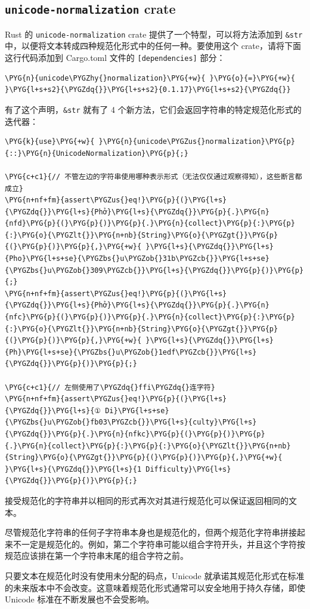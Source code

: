 \subsection{\texttt{unicode-normalization} crate}

Rust 的 \texttt{unicode-normalization} crate 提供了一个特型，可以将方法添加到 \texttt{\&str} 中，以便将文本转成四种规范化形式中的任何一种。要使用这个 crate，请将下面这行代码添加到 Cargo.toml 文件的 \texttt{[dependencies]} 部分：

\begin{Verbatim}[commandchars=\\\{\},breaklines=true,breakanywhere=true,fontsize=\codefont,xleftmargin=17bp]
\PYG{n}{unicode\PYGZhy{}normalization}\PYG{+w}{ }\PYG{o}{=}\PYG{+w}{ }\PYG{l+s+s2}{\PYGZdq{}}\PYG{l+s+s2}{0.1.17}\PYG{l+s+s2}{\PYGZdq{}}
\end{Verbatim}

有了这个声明，\texttt{\&str} 就有了 4 个新方法，它们会返回字符串的特定规范化形式的迭代器：

\begin{Verbatim}[commandchars=\\\{\},breaklines=true,breakanywhere=true,fontsize=\codefont,xleftmargin=17bp]
\PYG{k}{use}\PYG{+w}{ }\PYG{n}{unicode\PYGZus{}normalization}\PYG{p}{::}\PYG{n}{UnicodeNormalization}\PYG{p}{;}

\PYG{c+c1}{// 不管左边的字符串使用哪种表示形式（无法仅仅通过观察得知），这些断言都成立}
\PYG{n+nf+fm}{assert\PYGZus{}eq!}\PYG{p}{(}\PYG{l+s}{\PYGZdq{}}\PYG{l+s}{Phở}\PYG{l+s}{\PYGZdq{}}\PYG{p}{.}\PYG{n}{nfd}\PYG{p}{(}\PYG{p}{)}\PYG{p}{.}\PYG{n}{collect}\PYG{p}{:}\PYG{p}{:}\PYG{o}{\PYGZlt{}}\PYG{n+nb}{String}\PYG{o}{\PYGZgt{}}\PYG{p}{(}\PYG{p}{)}\PYG{p}{,}\PYG{+w}{ }\PYG{l+s}{\PYGZdq{}}\PYG{l+s}{Pho}\PYG{l+s+se}{\PYGZbs{}u\PYGZob{}31b\PYGZcb{}}\PYG{l+s+se}{\PYGZbs{}u\PYGZob{}309\PYGZcb{}}\PYG{l+s}{\PYGZdq{}}\PYG{p}{)}\PYG{p}{;}
\PYG{n+nf+fm}{assert\PYGZus{}eq!}\PYG{p}{(}\PYG{l+s}{\PYGZdq{}}\PYG{l+s}{Phở}\PYG{l+s}{\PYGZdq{}}\PYG{p}{.}\PYG{n}{nfc}\PYG{p}{(}\PYG{p}{)}\PYG{p}{.}\PYG{n}{collect}\PYG{p}{:}\PYG{p}{:}\PYG{o}{\PYGZlt{}}\PYG{n+nb}{String}\PYG{o}{\PYGZgt{}}\PYG{p}{(}\PYG{p}{)}\PYG{p}{,}\PYG{+w}{ }\PYG{l+s}{\PYGZdq{}}\PYG{l+s}{Ph}\PYG{l+s+se}{\PYGZbs{}u\PYGZob{}1edf\PYGZcb{}}\PYG{l+s}{\PYGZdq{}}\PYG{p}{)}\PYG{p}{;}

\PYG{c+c1}{// 左侧使用了\PYGZdq{}ffi\PYGZdq{}连字符}
\PYG{n+nf+fm}{assert\PYGZus{}eq!}\PYG{p}{(}\PYG{l+s}{\PYGZdq{}}\PYG{l+s}{① Di}\PYG{l+s+se}{\PYGZbs{}u\PYGZob{}fb03\PYGZcb{}}\PYG{l+s}{culty}\PYG{l+s}{\PYGZdq{}}\PYG{p}{.}\PYG{n}{nfkc}\PYG{p}{(}\PYG{p}{)}\PYG{p}{.}\PYG{n}{collect}\PYG{p}{:}\PYG{p}{:}\PYG{o}{\PYGZlt{}}\PYG{n+nb}{String}\PYG{o}{\PYGZgt{}}\PYG{p}{(}\PYG{p}{)}\PYG{p}{,}\PYG{+w}{ }\PYG{l+s}{\PYGZdq{}}\PYG{l+s}{1 Difficulty}\PYG{l+s}{\PYGZdq{}}\PYG{p}{)}\PYG{p}{;}
\end{Verbatim}

接受规范化的字符串并以相同的形式再次对其进行规范化可以保证返回相同的文本。

尽管规范化字符串的任何子字符串本身也是规范化的，但两个规范化字符串拼接起来不一定是规范化的。例如，第二个字符串可能以组合字符开头，并且这个字符按规范应该排在第一个字符串末尾的组合字符之前。

只要文本在规范化时没有使用未分配的码点，Unicode 就承诺其规范化形式在标准的未来版本中不会改变。这意味着规范化形式通常可以安全地用于持久存储，即使 Unicode 标准在不断发展也不会受影响。

